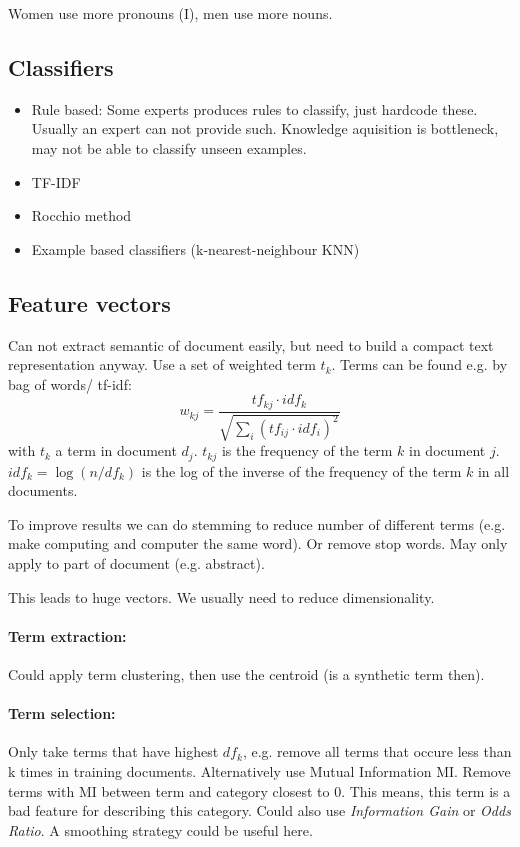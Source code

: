 \documentclass[11pt]{article}
\begin{document}
Women use more pronouns (I), men use more nouns. 

\subsection{Classifiers}
\begin{itemize}
	\item Rule based: Some experts produces rules to classify, just hardcode these. Usually
	an expert can not provide such. Knowledge aquisition is bottleneck, may not be 
	able to classify unseen examples.
	\item TF-IDF
	\item Rocchio method
	\item Example based classifiers (k-nearest-neighbour KNN)
\end{itemize}
\subsection{Feature vectors}
Can not extract semantic of document easily, but need to build a compact text representation anyway. Use a set of weighted term $t_k$. Terms can be found e.g. by bag
of words/ tf-idf:
\begin{equation}
	w_{kj} = \frac{tf_{kj}\cdot idf_k}{\sqrt{\sum_i (tf_{ij}\cdot idf_i)^2}}
\end{equation}
with $t_k$ a term in document $d_j$. $t_{kj}$ is the frequency of the term $k$ in 
document $j$. $idf_k = \log(n/df_k)$ is the log of the
inverse of the frequency of the term $k$ in 
all documents. 

To improve results we can do stemming to reduce number of different terms (e.g. make
computing and computer the same word). Or remove stop words. May only apply to part
of document (e.g. abstract).

This leads to huge vectors. We usually need
to reduce dimensionality. 
\paragraph{Term extraction:} Could apply term clustering, then use the centroid (is a synthetic term then).
\paragraph{Term selection:} Only take terms
that have highest $df_k$, e.g. remove
all terms that occure less than k times
in training documents. Alternatively use Mutual Information MI. Remove terms with MI between term and category closest to 0.
This means, this term is a bad feature for describing this category.
Could also use \emph{Information Gain} or \emph{Odds Ratio}. 
A smoothing strategy could be useful here.
\end{document}
